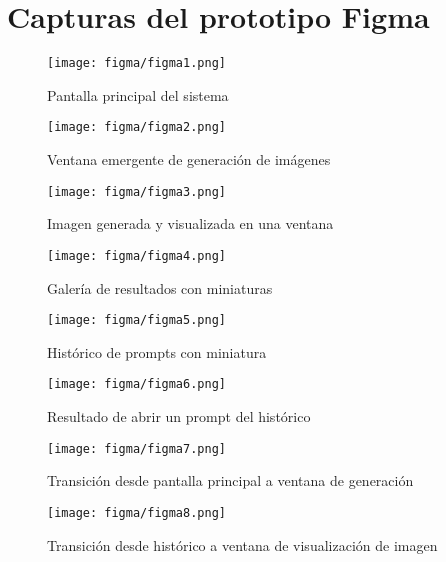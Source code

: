 \section{Capturas del prototipo Figma}
\label{anexo:figma}

\begin{figure}[H]
    \centering
    \texttt{[image: figma/figma1.png]}
    \caption{Pantalla principal del sistema}
\end{figure}

\begin{figure}[H]
    \centering
    \texttt{[image: figma/figma2.png]}
    \caption{Ventana emergente de generación de imágenes}
\end{figure}

\begin{figure}[H]
    \centering
    \texttt{[image: figma/figma3.png]}
    \caption{Imagen generada y visualizada en una ventana}
\end{figure}

\begin{figure}[H]
    \centering
    \texttt{[image: figma/figma4.png]}
    \caption{Galería de resultados con miniaturas}
\end{figure}

\begin{figure}[H]
    \centering
    \texttt{[image: figma/figma5.png]}
    \caption{Histórico de prompts con miniatura}
\end{figure}

\begin{figure}[H]
    \centering
    \texttt{[image: figma/figma6.png]}
    \caption{Resultado de abrir un prompt del histórico}
\end{figure}

\begin{figure}[H]
    \centering
    \texttt{[image: figma/figma7.png]}
    \caption{Transición desde pantalla principal a ventana de generación}
\end{figure}

\begin{figure}[H]
    \centering
    \texttt{[image: figma/figma8.png]}
    \caption{Transición desde histórico a ventana de visualización de imagen}
\end{figure}